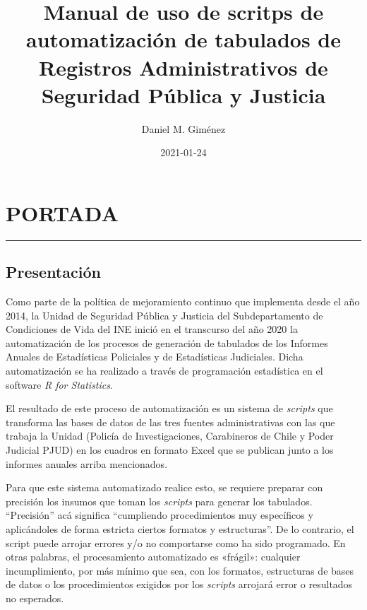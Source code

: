\documentclass[
  spanish,
]{book}
\title{Manual de uso de scritps de automatización de tabulados de Registros Administrativos de Seguridad Pública y Justicia}
\author{Daniel M. Giménez}
\date{2021-01-24}
\begin{document}
\maketitle

{
\setcounter{tocdepth}{1}
\tableofcontents
}
\hypertarget{part-portada}{%
\part*{PORTADA}\label{part-portada}}

\begin{center}\rule{0.5\linewidth}{0.5pt}\end{center}

\hypertarget{presentaciuxf3n}{%
\chapter*{Presentación}\label{presentaciuxf3n}}

Como parte de la política de mejoramiento continuo que implementa desde el año 2014, la Unidad de Seguridad Pública y Justicia del Subdepartamento de Condiciones de Vida del INE inició en el transcurso del año 2020 la automatización de los procesos de generación de tabulados de los Informes Anuales de Estadísticas Policiales y de Estadísticas Judiciales. Dicha automatización se ha realizado a través de programación estadística en el software \emph{R for Statistics}.

El resultado de este proceso de automatización es un sistema de \emph{scripts} que transforma las bases de datos de las tres fuentes administrativas con las que trabaja la Unidad (Policía de Investigaciones, Carabineros de Chile y Poder Judicial PJUD) en los cuadros en formato Excel que se publican junto a los informes anuales arriba mencionados.

Para que este sistema automatizado realice esto, se requiere preparar con precisión los insumos que toman los \emph{scripts} para generar los tabulados. ``Precisión'' acá significa ``cumpliendo procedimientos muy específicos y aplicándoles de forma estricta ciertos formatos y estructuras''. De lo contrario, el script puede arrojar errores y/o no comportarse como ha sido programado. En otras palabras, el procesamiento automatizado es «frágil»: cualquier incumplimiento, por más mínimo que sea, con los formatos, estructuras de bases de datos o los procedimientos exigidos por los \emph{scripts} arrojará error o resultados no esperados.
\end{document}
